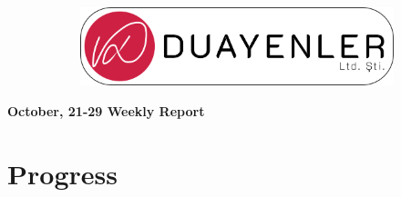 \documentclass[a4paper,12pt]{article}
\begin{document}
	
\begin{figure}
	\vspace*{-.7cm}
	\centering
	\begin{figure}[H]
		\centering
		\setlength{\unitlength}{\textwidth} 
		\includegraphics[width=0.9\unitlength]{../../../Documents/logos/logo3-with-stroke}
	\end{figure}
\end{figure}
\vspace*{-1.7cm}
\begin{center}
	\Large\textbf{October, 21-29 Weekly Report}
	\end{center}



\section{Progress}
\end{document}
